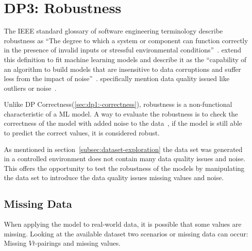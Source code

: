 \section{DP3: Robustness}\label{sec:robustness}



The IEEE standard glossary of software engineering terminology describe
robustness as ``The degree
to which a system or component can function correctly in the presence of
invalid inputs or
stressful environmental conditions''~\cite[p. 64]{terminology1990ieee}.
\cite{saez2016evaluating} extend this definition to fit machine learning
models and describe it
as the ``capability of an algorithm to build models that are insensitive to
data corruptions and
suffer less from the impact of noise''~\cite[p.
2]{saez_evaluatingclassifierbehavior_2016}.
\cite{siebert2022construction} specifically mention data quality issued like
outliers or noise~\cite[p. 16]{siebert2022construction}.

Unlike \ac{DP} Correctness(\ref{sec:dp1:-correctness}), robustness is a
non-functional characteristic of a \ac{ML} model.
A way to evaluate the robustness is to check the correctness of the model with
added noise to the data~\cite[p. 18]{zhou_machinelearning_2021}, if the model
is still able to predict the correct values, it is considered robust.

As mentioned in section~\ref{subsec:dataset-exploration} the data set
was generated in a controlled environment does not contain many data quality
issues and noise.
This offers the opportunity to test the robustness of the models by manipulating the
data set to introduce the data quality issues missing values and noise.

\subsection{Missing Data}\label{subsec:missing-data}
When applying the model to real-world data, it is possible that some values
are missing.
Looking at the available dataset two scenarios or missing data can occur:
Missing \(Vt\)-pairings and missing values.

